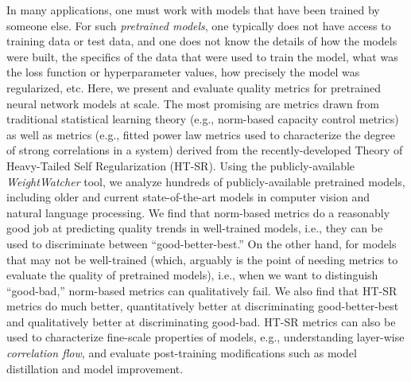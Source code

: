 
In many applications,
one must work with models that have been trained by someone else.
For such \emph{pretrained models}, one typically does not have access to training data or test data, and one does not know the details of how the models were built, the specifics of the data that were used to train the model, what was the loss function or hyperparameter values, how precisely the model was regularized, etc.
Here, we present and evaluate quality metrics for pretrained neural network models at scale.
The most promising are metrics drawn from traditional statistical learning theory (e.g., norm-based capacity control metrics) as well as metrics (e.g., fitted power law metrics used to characterize the degree of strong correlations in a system) derived from the recently-developed Theory of Heavy-Tailed Self Regularization (HT-SR).
Using the publicly-available \emph{WeightWatcher} tool, we analyze hundreds of publicly-available pretrained models, including older and current state-of-the-art models in computer vision and natural language processing.
We find that norm-based metrics do a reasonably good job at predicting quality trends in well-trained models, i.e., they can be used to discriminate between ``good-better-best.'' 
On the other hand, for models that may not be well-trained (which, arguably is the point of needing metrics to evaluate the quality of pretrained models), i.e., when we want to distinguish ``good-bad,'' norm-based metrics can qualitatively fail. 
We also find that HT-SR metrics do much better, quantitatively better at discriminating good-better-best and qualitatively better at discriminating good-bad.
HT-SR metrics can also be used to characterize fine-scale properties of models, e.g., understanding layer-wise \emph{correlation flow}, and evaluate post-training modifications such as model distillation and model improvement.

